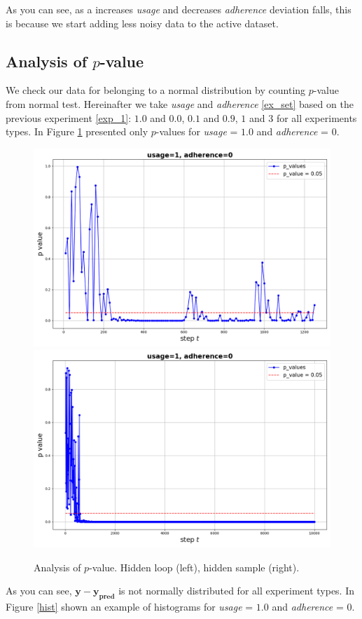 \documentclass{article}
\begin{document}
        As you can see, as a increases \textit{usage} and decreases \textit{adherence} deviation falls, this is because we start adding less noisy data to the active dataset.
        
    \subsection{Analysis of $p$-value} \label{exp_2}
        We check our data for belonging to a normal distribution by counting $p$-value from normal test. Hereinafter we take \textit{usage} and \textit{adherence} \ref{ex_set} based on the previous experiment \ref{exp_1}: $1.0$ and $0.0$, $0.1$ and $0.9$, $1$ and $3$ for all experiments types. In Figure \ref{p_value} presented only $p$-values for \textit{usage} = $1.0$ and \textit{adherence} = $0$.

        \begin{figure}[h!]
            \centering
            \includegraphics[width=0.49\linewidth]{pictures/p_loop_1_0.png}
            \includegraphics[width=0.49\linewidth]{pictures/p_sample_1_0.png}
            
            \caption{Analysis of $p$-value. Hidden loop (left), hidden sample (right).}
            \label{p_value}
        \end{figure}

\newpage
        
        As you can see, $\mathbf{y} - \mathbf{y_{\text{pred}}}$ is not normally distributed for all experiment types. In Figure \ref{hist} shown an example of histograms for \textit{usage} = $1.0$ and \textit{adherence} = $0$.
\end{document}

